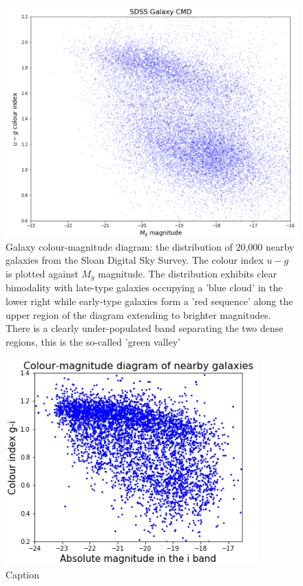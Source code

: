 \begin{figure}
	\includegraphics[width=\columnwidth]{images/CMDs/galaxyCMD.PNG}
    \caption[Galaxy CMD]{Galaxy colour-magnitude diagram: the distribution of 20,000 nearby galaxies from the Sloan Digital Sky Survey. The colour index $u-g$ is plotted against $M_g$ magnitude. The distribution exhibits clear bimodality with late-type galaxies occupying a 'blue cloud' in the lower right while early-type galaxies form a 'red sequence' along the upper region of the diagram extending to brighter magnitudes. There is a clearly under-populated band separating the two dense regions, this is the so-called 'green valley'}
    \label{fig:CMD1}
\end{figure}


\begin{figure}
    \centering
    \includegraphics[width=\columnwidth]{images/CMDs/CMD-G_i-i.png}
    \caption{Caption}
    \label{fig:CMD-G_i-i}
\end{figure}


